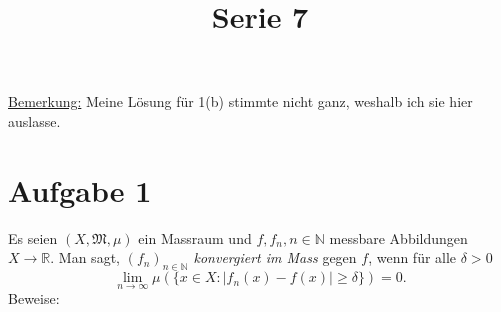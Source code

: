 \documentclass[10pt]{article}\usepackage[]{graphicx}\usepackage[]{color}
\title{Serie 7}
\date{}
\author{}
\newcommand{\N}{\mathbb{N}}
\newcommand{\R}{\mathbb{R}}
\begin{document}
\maketitle

\uline{Bemerkung:} Meine Lösung für 1(b) stimmte nicht ganz,
weshalb ich sie hier auslasse.


\section*{Aufgabe 1}
Es seien $(X, \mathfrak{M}, \mu)$ ein Massraum
und $f, f_n, n \in \N$ messbare Abbildungen $X \to \R$.
Man sagt, \textit{$(f_n)_{n \in \N}$ konvergiert im Mass}
gegen $f$, wenn für alle $\delta > 0$
\[
  \lim_{n \to \infty} \mu(\{x \in X : |f_n(x) - f(x)| 
    \geq \delta \}) = 0.
\]
Beweise:
\end{document}
